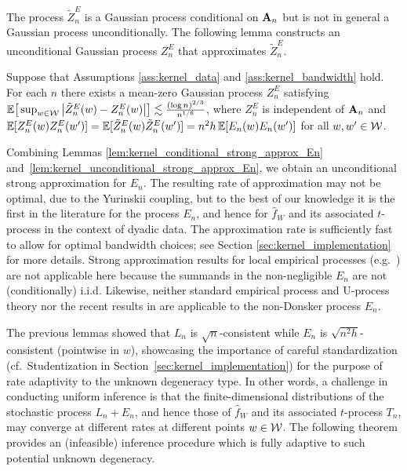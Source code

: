 The process $\tilde Z_n^E$ is a Gaussian process conditional on $\mathbf{A}_n$ but is
not in general a Gaussian process unconditionally. The following lemma
constructs an unconditional Gaussian process $Z_n^E$ that approximates
$\tilde Z_n^E$.

\begin{lemma}
  \label{lem:kernel_unconditional_strong_approx_En}

  Suppose that Assumptions \ref{ass:kernel_data} and
  \ref{ass:kernel_bandwidth} hold. For each $n$ there exists
  a mean-zero Gaussian process $Z^E_n$ satisfying
  $\mathbb{E}\big[ \sup_{w \in \mathcal{W}} \big|\tilde Z_n^E(w) - Z_n^E(w)\big| \big]
  \lesssim \frac{(\log n)^{2/3}}{n^{1/6}}$,
  where $Z_n^E$ is independent of $\mathbf{A}_n$ and
  $\mathbb{E}[Z_n^E(w)Z_n^E(w')]=\mathbb{E}[\tilde Z_n^E(w)\tilde Z_n^E(w')]
  = n^2h \, \mathbb{E}[E_n(w)E_n(w')]$ for all $w, w' \in \mathcal{W}$.
\end{lemma}

Combining Lemmas \ref{lem:kernel_conditional_strong_approx_En}
and~\ref{lem:kernel_unconditional_strong_approx_En}, we obtain
an unconditional strong
approximation for $E_n$. The resulting rate of approximation may not be
optimal, due to the Yurinskii coupling, but to the best of our knowledge it is
the first in the literature for the process $E_n$, and hence for $\hat{f}_W$
and its associated $t$-process in the context of dyadic data. The approximation
rate is sufficiently fast to allow for optimal bandwidth choices; see Section
\ref{sec:kernel_implementation} for more details. Strong approximation results
for
local empirical processes (e.g.\ \citealp{gine2010confidence}) are not
applicable here because the summands in the non-negligible $E_n$ are not
(conditionally) i.i.d. Likewise, neither standard empirical process and
U-process theory \citep{van1996weak,gine2021mathematical} nor the recent
results in \citet{davezies2021exchangeable} are applicable to the non-Donsker
process $E_n$.

The previous lemmas showed that $L_n$ is $\sqrt{n}$-consistent while $E_n$ is
$\sqrt{n^2h}$-consistent (pointwise in $w$), showcasing the importance of
careful standardization (cf.\ Studentization in
Section~\ref{sec:kernel_implementation}) for the purpose of rate adaptivity to
the
unknown degeneracy type. In other words, a challenge in conducting uniform
inference is that the finite-dimensional distributions of the stochastic
process $L_n+E_n$, and hence those of $\hat{f}_W$ and its associated
$t$-process $T_n$, may converge at different rates at different points
$w\in\mathcal{W}$. The following theorem provides an (infeasible) inference procedure
which is fully adaptive to such potential unknown degeneracy.


